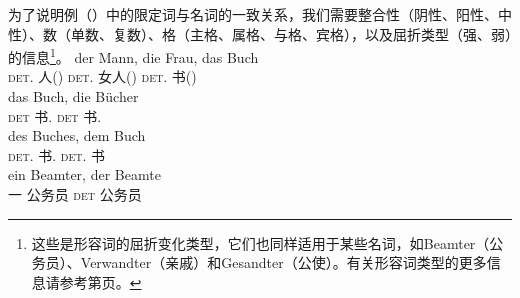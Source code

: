 为了说明例（）中的限定词与名词的一致关系，我们需要整合性（阴性、阳性、中性）、数（单数、复数）、格（主格、属格、与格、宾格），以及屈折类型（强、弱）的信息\footnote{%
这些是形容词的屈折变化类型，它们也同样适用于某些名词，如Beamter（公务员）、Verwandter（亲戚）和Gesandter（公使）。有关形容词类型的更多信息请参考第\pageref{page-Flexionsklasse-Wunderlich}页。
}。
\eal\settowidth{}
\ex 
\gll der Mann, die Frau, das Buch\\
	 \textsc{det}.\mas{} 人(\mas) \textsc{det}.\fem{} 女人(\fem) \textsc{det}.\neu{} 书(\neu)\\
\ex 
\gll das Buch, die Bücher\\
	 \textsc{det} 书.\sg{} \textsc{det} 书.\pl\\
\ex 
\gll des Buches, dem Buch\\
	 \textsc{det}.\gen{} 书.\gen{} \textsc{det}.\dat{} 书\\
\ex{} 
\gll ein Beamter, der Beamte\\
	 一 公务员 \textsc{det} 公务员\\
\zl
